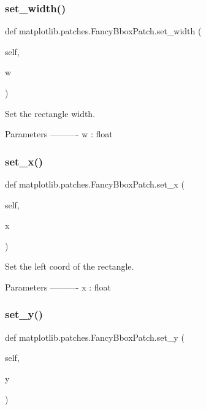 \subsubsection{\texorpdfstring{set\+\_\+width()}{set\_width()}}
{\footnotesize\ttfamily def matplotlib.\+patches.\+Fancy\+Bbox\+Patch.\+set\+\_\+width (\begin{DoxyParamCaption}\item[{}]{self,  }\item[{}]{w }\end{DoxyParamCaption})}

\begin{DoxyVerb}Set the rectangle width.

Parameters
----------
w : float
\end{DoxyVerb}
 \mbox{\label{classmatplotlib_1_1patches_1_1FancyBboxPatch_a189b7369381e7f27133f83c6647bc958}} 
\subsubsection{\texorpdfstring{set\+\_\+x()}{set\_x()}}
{\footnotesize\ttfamily def matplotlib.\+patches.\+Fancy\+Bbox\+Patch.\+set\+\_\+x (\begin{DoxyParamCaption}\item[{}]{self,  }\item[{}]{x }\end{DoxyParamCaption})}

\begin{DoxyVerb}Set the left coord of the rectangle.

Parameters
----------
x : float
\end{DoxyVerb}
 \mbox{\label{classmatplotlib_1_1patches_1_1FancyBboxPatch_a599aa8b30f79df1332cc30ac4d9f686a}} 
\subsubsection{\texorpdfstring{set\+\_\+y()}{set\_y()}}
{\footnotesize\ttfamily def matplotlib.\+patches.\+Fancy\+Bbox\+Patch.\+set\+\_\+y (\begin{DoxyParamCaption}\item[{}]{self,  }\item[{}]{y }\end{DoxyParamCaption})}

